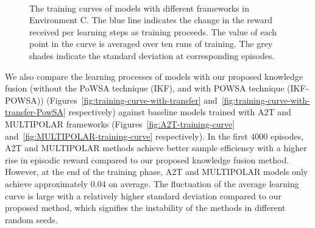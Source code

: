 \documentclass[lettersize,journal]{IEEEtran}
\begin{document}
\begin{figure*}[!htb]
\centering
    \hspace{1em}
    \hspace{1em}
    \\
    \hspace{1em}
    \caption{The training curves of models with different frameworks in Environment C. The blue line indicates the change in the reward received per learning steps as training proceeds. The value of each point in the curve is averaged over ten runs of training. The grey shades indicate the standard deviation at corresponding episodes.}
\label{fig:retraining-curve}
\end{figure*}

We also compare the learning processes of models with our proposed knowledge fusion (without the PoWSA technique (IKF), and with POWSA technique (IKF-POWSA)) (Figures~\ref{fig:training-curve-with-transfer} and~\ref{fig:training-curve-with-transfer-PowSA} respectively) against baseline models trained with A2T and MULTIPOLAR frameworks (Figures~\ref{fig:A2T-training-curve} and~\ref{fig:MULTIPOLAR-training-curve} respectively). In the first 4000 episodes, A2T and MULTIPOLAR methods achieve better sample efficiency with a higher rise in episodic reward compared to our proposed knowledge fusion method. However, at the end of the training phase, A2T and MULTIPOLAR models only achieve approximately 0.04 on average. The fluctuation of the average learning curve is large with a relatively higher standard deviation compared to our proposed method, which signifies the instability of the methods in different random seeds.
\end{document}
